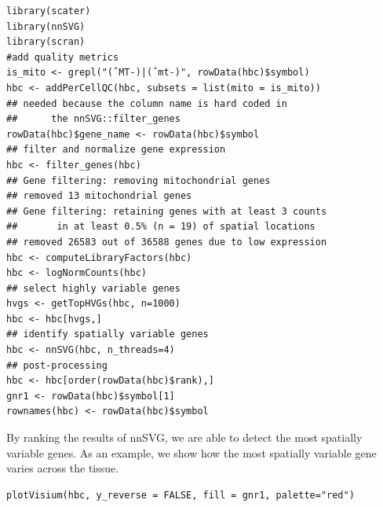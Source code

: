 \documentclass[graybox]{svmult}
\begin{document}
\begin{shaded}
\begin{verbatim}
library(scater)
library(nnSVG)
library(scran)
#add quality metrics
is_mito <- grepl("(ˆMT-)|(ˆmt-)", rowData(hbc)$symbol)
hbc <- addPerCellQC(hbc, subsets = list(mito = is_mito))
## needed because the column name is hard coded in 
##      the nnSVG::filter_genes
rowData(hbc)$gene_name <- rowData(hbc)$symbol
## filter and normalize gene expression
hbc <- filter_genes(hbc)
## Gene filtering: removing mitochondrial genes
## removed 13 mitochondrial genes
## Gene filtering: retaining genes with at least 3 counts 
##       in at least 0.5% (n = 19) of spatial locations
## removed 26583 out of 36588 genes due to low expression
hbc <- computeLibraryFactors(hbc)
hbc <- logNormCounts(hbc)
## select highly variable genes
hvgs <- getTopHVGs(hbc, n=1000)
hbc <- hbc[hvgs,]
## identify spatially variable genes
hbc <- nnSVG(hbc, n_threads=4)
## post-processing
hbc <- hbc[order(rowData(hbc)$rank),]
gnr1 <- rowData(hbc)$symbol[1]
rownames(hbc) <- rowData(hbc)$symbol
\end{verbatim}
\end{shaded}

By ranking the results of nnSVG, we are able to detect the most spatially
variable genes. As an example, we show how the most spatially variable gene varies
across the tissue.


\begin{shaded}
\begin{verbatim}
plotVisium(hbc, y_reverse = FALSE, fill = gnr1, palette="red")
\end{verbatim}
\end{shaded}
\end{document}
